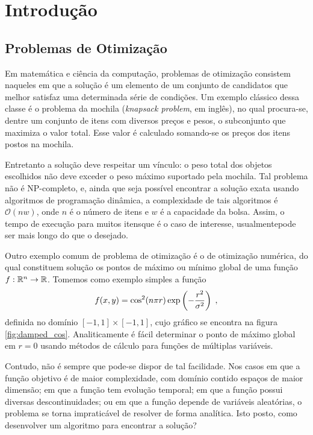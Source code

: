 \chapter{Introdução}\label{cap_introducao}

\section{Problemas de Otimização}

Em matemática e ciência da computação, problemas de otimização consistem naqueles em que
a solução é um elemento de um conjunto de candidatos que melhor satisfaz uma determinada
série de condições. Um exemplo clássico dessa classe é o problema da mochila 
(\textit{knapsack problem}, em inglês)\cite{knapsack_wiki}, no qual
procura-se, dentre um conjunto de itens com diversos preços e pesos, o subconjunto que
maximiza o valor total. Esse valor é calculado somando-se os preços dos itens postos na
mochila. 

Entretanto a solução deve respeitar um vínculo: o peso total dos objetos escolhidos
não deve exceder o peso máximo suportado pela mochila. Tal problema não é NP-completo, e,
ainda que seja possível encontrar a solução exata usando algoritmos de programação dinâmica,
a complexidade de tais algoritmos é $ \mathcal{O} (n w) $, onde $n$ é o número de itens e $w$ é a
capacidade da bolsa. Assim, o tempo de execução para muitos itens\trav que é o caso de interesse,
usualmente\trav pode ser mais longo do que o desejado.

Outro exemplo comum de problema de otimização é o de otimização numérica, do qual constituem
solução os pontos de máximo ou mínimo global de uma função 
$ f : \mathbb{R}^n \rightarrow \mathbb{R} $. Tomemos como exemplo simples a função
\begin{equation}
  f(x, y) = \cos^2(n\pi r)\exp\left(-\frac{r^2}{\sigma^2}\right) \;\mathrm{,}
  \label{eq:damped_cos}
\end{equation}
definida no domínio $ [-1, 1] \times [-1, 1] $, cujo gráfico se encontra na figura \ref{fig:damped_cos}. 
Analiticamente é fácil determinar o ponto de máximo global em $ r = 0 $ usando métodos de cálculo
para funções de múltiplas variáveis. 

Contudo, não é sempre que pode-se dispor de tal facilidade. 
Nos casos em que a função objetivo é de maior complexidade, com domínio contido espaços de maior dimensão; 
em que a função tem evolução temporal; em que a função possui diversas descontinuidades; ou em que a função
depende de variáveis aleatórias, o problema se torna impraticável de resolver de forma analítica. 
Isto posto, como desenvolver um algoritmo para encontrar a solução?

